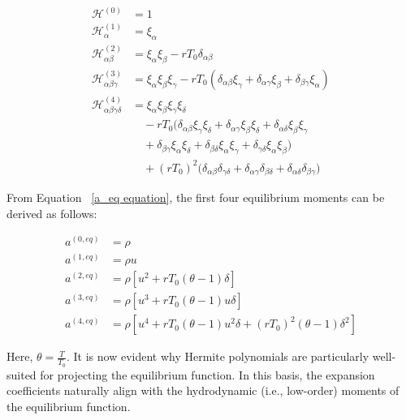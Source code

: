 \begin{equation}
	\begin{aligned}
		\mathcal{H}^{(0)} &= 1 \\
		\mathcal{H}_{\alpha}^{(1)} &= \xi_{\alpha} \\
		\mathcal{H}_{\alpha\beta}^{(2)} &= \xi_{\alpha}\xi_{\beta} - rT_0\delta_{\alpha\beta} \\
		\mathcal{H}_{\alpha\beta\gamma}^{(3)} &= \xi_{\alpha}\xi_{\beta}\xi_{\gamma} 
		- rT_0\left(\delta_{\alpha\beta}\xi_{\gamma} + \delta_{\alpha\gamma}\xi_{\beta} + \delta_{\beta\gamma}\xi_{\alpha}\right)\\
		\mathcal{H}_{\alpha\beta\gamma\delta}^{(4)} &= \xi_{\alpha}\xi_{\beta}\xi_{\gamma}\xi_{\delta} \\
    	&\quad - rT_0 \big(
    	    \delta_{\alpha\beta}\xi_{\gamma}\xi_{\delta} 
    	    + \delta_{\alpha\gamma}\xi_{\beta}\xi_{\delta} 
    	    + \delta_{\alpha\delta}\xi_{\beta}\xi_{\gamma} \\
    	&\quad 
    	    + \delta_{\beta\gamma}\xi_{\alpha}\xi_{\delta} 
    	    + \delta_{\beta\delta}\xi_{\alpha}\xi_{\gamma} 
    	    + \delta_{\gamma\delta}\xi_{\alpha}\xi_{\beta} 
    	\big) \\
    	&\quad + (rT_0)^2 \big(
    	    \delta_{\alpha\beta}\delta_{\gamma\delta} 
    	    + \delta_{\alpha\gamma}\delta_{\beta\delta} 
    	    + \delta_{\alpha\delta}\delta_{\beta\gamma}
    	\big)	
	\end{aligned}
\end{equation}	

From Equation ~\ref{a_eq equation}, the first four equilibrium moments can be
derived as follows:

\begin{equation}
	\begin{aligned}
		a^{(0,eq)} &= \rho\\
		a^{(1,eq)} &= \rho u\\
		a^{(2,eq)} &= \rho\left[u^2 + rT_0(\theta -1)\delta\right]\\
		a^{(3,eq)} &= \rho\left[u^3 + rT_0(\theta -1)u\delta\right]\\
		a^{(4,eq)} &= \rho\left[u^4 + rT_0(\theta -1)u^2\delta + (rT_0)^2(\theta - 1)\delta^2\right]
	\end{aligned}
\end{equation}

Here, $\theta=\frac{T}{T_0}$. It is now evident why Hermite polynomials are
particularly well-suited for projecting the equilibrium function. In this basis,
the expansion coefficients naturally align with the hydrodynamic (i.e.,
low-order) moments of the equilibrium function.

